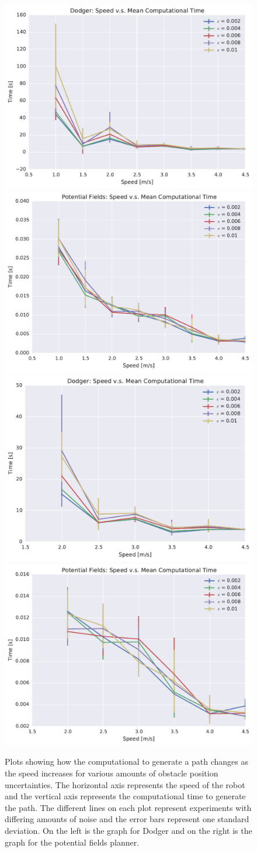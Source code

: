 \begin{figure}[h!]
    \centering
    \includegraphics[width=0.48\linewidth]{figs/planner_mean_times_2}
    \includegraphics[width=0.48\linewidth]{figs/pf_mean_times_2} \\
    \includegraphics[width=0.48\linewidth]{figs/planner_small_mean_times_2}
    \includegraphics[width=0.48\linewidth]{figs/pf_small_mean_times_2}

    \caption{Plots showing how the computational to generate a path changes as
        the speed increases for various amounts of obstacle position
        uncertainties.  The horizontal axis represents the speed of the robot
        and the vertical axis represents the computational time to generate the
        path. The different lines on each plot represent experiments with
        differing amounts of noise and the error bars represent one standard
        deviation.  On the left is the graph for Dodger and on the right is the
    graph for the potential fields planner.}

\end{figure}

